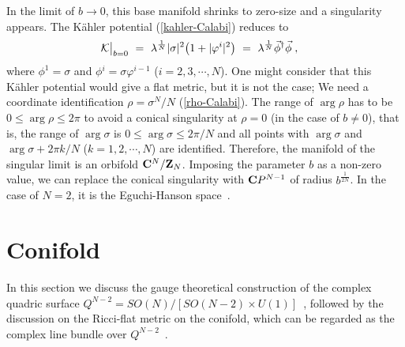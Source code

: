 \documentclass[a4paper,11pt]{article}
\newcommand{\kahler}{K\"{a}hler }
\begin{document}
{In the limit of $b\to 0$, this base manifold shrinks to 
zero-size and a singularity appears.
The \kahler potential (\ref{kahler-Calabi}) reduces to 
\begin{align}
{\cal K} \big|_{b = 0} 
\ &= \ 
\lambda^{\frac{1}{N}} |\sigma|^{2} \big( 1 + |\varphi^i|^2 \big) 
\ = \ \lambda^{\frac{1}{N}} \vec{\phi}^{\dagger} \vec{\phi}\;,
\end{align}
where $\phi^1 = \sigma$ and $\phi{}^i = \sigma \varphi^{i-1}$ 
($i = 2, 3, \cdots, N$). 
One might consider that 
this \kahler potential would give a flat metric, 
but it is not the case; 
We need a coordinate identification $\rho = \sigma^N /N$
(\ref{rho-Calabi}). 
The range of $\arg \rho$ has to be $0 \leq \arg \rho \leq 2 \pi$ to
avoid a conical singularity at $\rho = 0$ 
(in the case of $b \neq 0$),
that is,
the range of $\arg \sigma$ is $0 \leq \arg \sigma \leq 2 \pi/N$ and
all points with $\arg \sigma$ and $\arg \sigma + 2 \pi k/N$ ($k = 1,2,
\cdots, N$) are identified.
Therefore, the manifold of    
the singular limit is an orbifold ${\bf C}^N / {\bf Z}_N$. 
Imposing the parameter $b$ as a non-zero value,
we can replace the conical singularity with ${\bf C}P^{N-1}$ of
radius $b^{\frac{1}{2N}}$.
In the case of $N=2$, it is the Eguchi-Hanson 
space~\cite{EH}. 


\section{Conifold} \label{LQ}

In this section we discuss the gauge theoretical 
construction of the complex quadric surface
$Q^{N-2}= SO(N)/[SO(N-2) \times U(1)]$~\cite{HN1,HN2,HKNT}, 
followed by the discussion on 
the Ricci-flat metric on the conifold, 
which can be regarded as the complex line bundle 
over $Q^{N-2}$~\cite{HKN2}.

}
\end{document}

